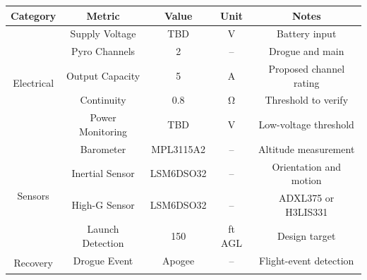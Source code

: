 
\begin{table}[H]
    \centering
    \begin{tabular}{ccccc}
    \toprule
    \textbf{Category} & \textbf{Metric} & \textbf{Value} & \textbf{Unit} & \textbf{Notes} \\ 
    \midrule


    \multirow{5}{*}{Electrical}
        & Supply Voltage
        & TBD
        & \unit{\volt}
        & Battery input \\
    \cmidrule(lr){2-5}

        & Pyro Channels
        & 2
        & --
        & Drogue and main \\
    \cmidrule(lr){2-5}

        & Output Capacity
        & 5
        & \unit{\ampere}
        & Proposed channel rating \\
    \cmidrule(lr){2-5}

        & Continuity
        & 0.8
        & \unit{\ohm}
        & Threshold to verify \\
    \cmidrule(lr){2-5}

        & Power Monitoring
        & TBD
        & \unit{\volt}
        & Low-voltage threshold \\
    \midrule


    \multirow{4}{*}{Sensors}
        & Barometer
        & MPL3115A2
        & --
        & Altitude measurement \\
    \cmidrule(lr){2-5}

        & Inertial Sensor
        & LSM6DSO32
        & --
        & Orientation and motion \\
    \cmidrule(lr){2-5}

        & High-G Sensor
        & LSM6DSO32
        & --
        & ADXL375 or H3LIS331 \\
    \cmidrule(lr){2-5}

        & Launch Detection
        & 150
        & ft AGL
        & Design target \\
    \midrule


    \multirow{3}{*}{Recovery}
        & Drogue Event
        & Apogee
        & --
        & Flight-event detection \\
    \cmidrule(lr){2-5}


\end{tabular}
\end{table}
